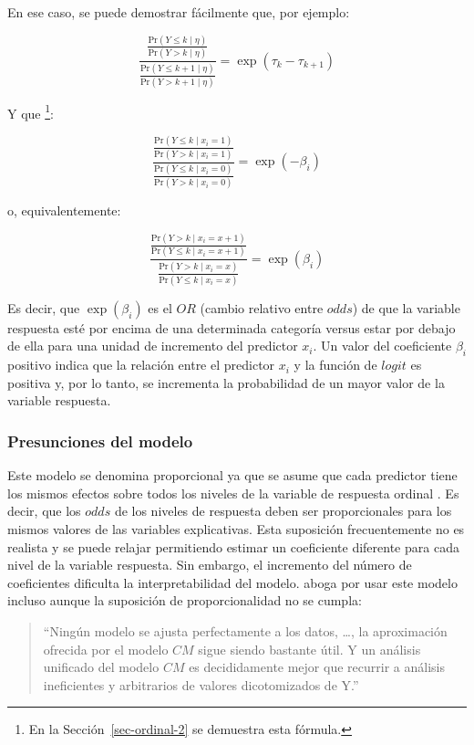 \documentclass[
  12pt,
  a4paper,
  extrafontsizes,
  onecolumn,
  openright,
  table]{memoir}
\newlength{\rf}
\begin{document}
En ese caso, se puede demostrar fácilmente que, por ejemplo:

\[\frac{\frac{\mathrm{Pr}(Y \leq k \mid \eta)}{\mathrm{Pr}(Y > k \mid \eta)}}{\frac{\mathrm{Pr}(Y \leq k+1 \mid \eta)}{\mathrm{Pr}(Y > k+1 \mid \eta)}} = \exp(\tau_{k} - \tau_{k+1})\]

Y que \footnote{En la Sección~\ref{sec-ordinal-2} se demuestra esta
  fórmula.}:

\[\frac{\frac{\mathrm{Pr}(Y \leq k \mid x_i = 1)}{\mathrm{Pr}(Y > k \mid x_i = 1)}}{\frac{\mathrm{Pr}(Y \leq k \mid x_i=0)}{\mathrm{Pr}(Y > k \mid x_i = 0)}} = \exp(-\beta_{i})\]

o, equivalentemente:

\[\frac{\frac{\mathrm{Pr}(Y > k \mid x_i = x + 1)}{\mathrm{Pr}(Y \leq k \mid x_i = x + 1)}}{\frac{\mathrm{Pr}(Y > k \mid x_i = x)}{\mathrm{Pr}(Y \leq k \mid x_i = x)}} = \exp(\beta_{i})\]

Es decir, que \(\exp(\beta_{i})\) es el \(OR\) (cambio relativo entre
\(odds\)) de que la variable respuesta esté por encima de una
determinada categoría versus estar por debajo de ella para una unidad de
incremento del predictor \(x_i\). Un valor del coeficiente \(\beta_i\)
positivo indica que la relación entre el predictor \(x_i\) y la función
de \(logit\) es positiva y, por lo tanto, se incrementa la probabilidad
de un mayor valor de la variable respuesta.

\hypertarget{presunciones-del-modelo}{%
\subsubsection{Presunciones del modelo}\label{presunciones-del-modelo}}

Este modelo se denomina proporcional ya que se asume que cada predictor
tiene los mismos efectos sobre todos los niveles de la variable de
respuesta ordinal \autocite[ver][]{Liu2202}. Es decir, que los \(odds\)
de los niveles de respuesta deben ser proporcionales para los mismos
valores de las variables explicativas. Esta suposición frecuentemente no
es realista y se puede relajar permitiendo estimar un coeficiente
diferente para cada nivel de la variable respuesta. Sin embargo, el
incremento del número de coeficientes dificulta la interpretabilidad del
modelo. \textcite{harrell2020} aboga por usar este modelo incluso aunque
la suposición de proporcionalidad no se cumpla:

\begin{quote}
\enquote{Ningún modelo se ajusta perfectamente a los datos, \ldots, la
aproximación ofrecida por el modelo \(CM\) sigue siendo bastante útil. Y
un análisis unificado del modelo \(CM\) es decididamente mejor que
recurrir a análisis ineficientes y arbitrarios de valores dicotomizados
de Y.}
\end{quote}
\end{document}

